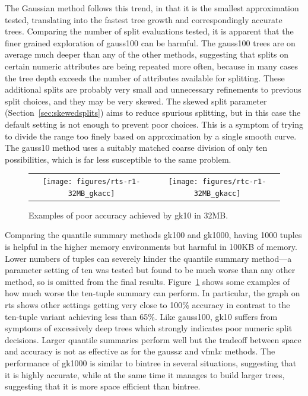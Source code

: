 The Gaussian method follows this trend, in that it is the smallest approximation tested, translating into the fastest tree growth and correspondingly accurate trees. Comparing the number of split evaluations tested, it is apparent that the finer grained exploration of {\sc gauss100} can be harmful.
The {\sc gauss100} trees are on average much deeper than any of the other methods, suggesting that splits on certain numeric attributes are being repeated more often, because in many cases the tree depth exceeds the number of attributes available for splitting. These additional splits are probably very small and unnecessary refinements to previous split choices, and they may be very skewed. The skewed split parameter (Section~\ref{sec:skewedsplits}) aims to reduce spurious splitting, but in this case the default setting is not enough to prevent poor choices.
This is a symptom of trying to divide the range too finely based on approximation by a single smooth curve. The {\sc gauss10} method uses a suitably matched coarse division of only ten possibilities, which is far less susceptible to the same problem.

\begin{figure}
\centering
\begin{tabular}{c@{}c}
\texttt{[image: figures/rts-r1-32MB\_gkacc]} &
\texttt{[image: figures/rtc-r1-32MB\_gkacc]} \\
\end{tabular}
\caption{Examples of poor accuracy achieved by {\sc gk10} in 32MB.}
\label{fig:gk10}
\end{figure}

Comparing the quantile summary methods {\sc gk100} and {\sc gk1000}, having 1000 tuples is helpful in the higher memory environments but harmful in 100KB of memory. Lower numbers of tuples can severely hinder the quantile summary method---a parameter setting of ten was tested but found to be much worse than any other method, so is omitted from the final results. Figure~\ref{fig:gk10} shows some examples of how much worse the ten-tuple summary can perform. In particular, the graph on {\sc rts} shows other settings getting very close to 100\% accuracy in contrast to the ten-tuple variant achieving less than 65\%. Like {\sc gauss100}, {\sc gk10} suffers from symptoms of excessively deep trees which strongly indicates poor numeric split decisions. Larger quantile summaries perform well but the tradeoff between space and accuracy is not as effective as for the {\sc gauss}$x$ and {\sc vfml}$x$ methods. The performance of {\sc gk1000} is similar to {\sc bintree} in several situations, suggesting that it is highly accurate, while at the same time it manages to build larger trees, suggesting that it is more space efficient than {\sc bintree}.

